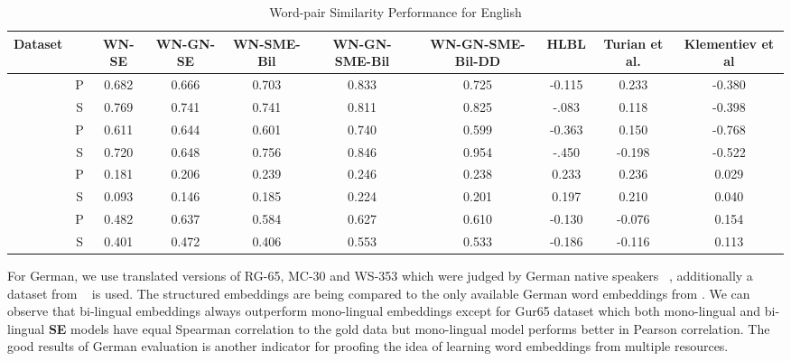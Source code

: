  
 \begin{table}[ht]
\caption{Word-pair Similarity Performance for English } %
\label{tbl:en-wp-sim}
\centering %
\tabcolsep=0.09cm
{\footnotesize
\begin{tabular}{c c c c c c c c c c} 
\hline\hline %
 Dataset & & WN-SE  & WN-GN-SE & WN-SME-Bil &  WN-GN-SME-Bil & WN-GN-SME-Bil-DD
 &HLBL& Turian et al.& Klementiev et al
\\ [0.5ex] 
\hline %
                          &P&0.682&0.666&0.703&0.833&0.725&-0.115&0.233&-0.380 \\[-1ex]
\raisebox{1.5ex}{RG-65}  &S&0.769&0.741&0.741&0.811&0.825&-.083&0.118&-0.398 \\[1ex]

                          &  P &0.611&0.644&0.601&0.740&0.599&-0.363&0.150&-0.768 \\[-1ex]
\raisebox{1.5ex}{MC-30}  &  S & 0.720&0.648&0.756&0.846&0.954&-.450&-0.198&-0.522 \\[1ex]

                           &  P &0.181&0.206&0.239&0.246&0.238&0.233&0.236&0.029 \\[-1ex]
\raisebox{1.5ex}{WS-353}  &  S &0.093&0.146&0.185&0.224&0.201&0.197&0.210&0.040 \\[1ex]


                                  &  P & 0.482&0.637&0.584&0.627&0.610&-0.130&-0.076&0.154 \\[-1ex]
\raisebox{1.5ex}{YangPowers-130}  &  S & 0.401&0.472&0.406&0.553&0.533&-0.186&-0.116& 0.113 \\[1ex]

\hline %
     
          
 \hline %
\end{tabular}
}
\label{tab:en-wp-sim}
\end{table}      


For German,
 we use translated versions of RG-65, MC-30 and WS-353 which were judged by
 German native speakers ~\cite{Zesch2008}, additionally a dataset from
 ~\cite{Zesch2006} is used. The structured embeddings are being
 compared to the only available German word embeddings from
 \cite{Klementiev}. We can observe that bi-lingual embeddings
 always outperform mono-lingual embeddings except for Gur65 dataset which
 both mono-lingual and bi-lingual \textbf{SE} models have equal Spearman
 correlation to the gold data but mono-lingual model performs better in Pearson
 correlation. The good results of German evaluation is another indicator for
 proofing the idea of learning word embeddings from multiple resources.

